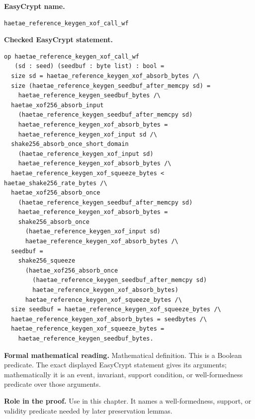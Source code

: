\begin{formaldefinition}
\noindent\textbf{EasyCrypt name.}
\begin{lstlisting}[language=EasyCrypt,basicstyle=\ttfamily\scriptsize]
haetae_reference_keygen_xof_call_wf
\end{lstlisting}
\noindent\textbf{Checked EasyCrypt statement.}
\begin{lstlisting}[language=EasyCrypt,basicstyle=\ttfamily\scriptsize]
op haetae_reference_keygen_xof_call_wf
   (sd : seed) (seedbuf : byte list) : bool =
  size sd = haetae_reference_keygen_xof_absorb_bytes /\
  size (haetae_reference_keygen_seedbuf_after_memcpy sd) =
    haetae_reference_keygen_seedbuf_bytes /\
  haetae_xof256_absorb_input
    (haetae_reference_keygen_seedbuf_after_memcpy sd)
    haetae_reference_keygen_xof_absorb_bytes =
    haetae_reference_keygen_xof_input sd /\
  shake256_absorb_once_short_domain
    (haetae_reference_keygen_xof_input sd)
    haetae_reference_keygen_xof_absorb_bytes /\
  haetae_reference_keygen_xof_squeeze_bytes < haetae_shake256_rate_bytes /\
  haetae_xof256_absorb_once
    (haetae_reference_keygen_seedbuf_after_memcpy sd)
    haetae_reference_keygen_xof_absorb_bytes =
    shake256_absorb_once
      (haetae_reference_keygen_xof_input sd)
      haetae_reference_keygen_xof_absorb_bytes /\
  seedbuf =
    shake256_squeeze
      (haetae_xof256_absorb_once
        (haetae_reference_keygen_seedbuf_after_memcpy sd)
        haetae_reference_keygen_xof_absorb_bytes)
      haetae_reference_keygen_xof_squeeze_bytes /\
  size seedbuf = haetae_reference_keygen_xof_squeeze_bytes /\
  haetae_reference_keygen_xof_absorb_bytes = seedbytes /\
  haetae_reference_keygen_xof_squeeze_bytes =
    haetae_reference_keygen_seedbuf_bytes.
\end{lstlisting}
\noindent\textbf{Formal mathematical reading.}
Mathematical definition. This is a Boolean predicate.  The exact displayed EasyCrypt statement gives its arguments; mathematically it is an event, invariant, support condition, or well-formedness predicate over those arguments.

\noindent\textbf{Role in the proof.}
Use in this chapter. It names a well-formedness, support, or validity predicate needed by later preservation lemmas.

\end{formaldefinition}

